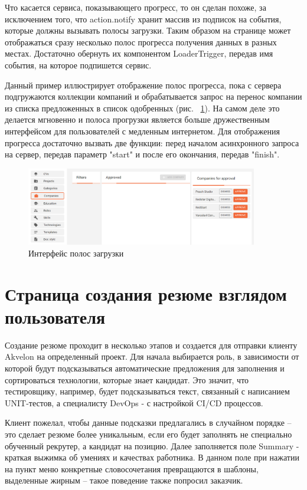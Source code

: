 \documentclass[a4paper,12pt]{diplom}
\begin{document}
Что касается сервиса, показывающего прогресс, то он сделан похоже, за исключением того, что action.notify хранит массив
из подписок на события, которые должны вызывать полосы загрузки. Таким образом на странице может отображаться сразу несколько полос прогресса получения данных в разных местах. Достаточно обернуть их
компонентом LoaderTrigger, передав имя события, на которое подпишется сервис.

Данный пример иллюстрирует отображение полос прогресса, пока с сервера подгружаются коллекции компаний и обрабатывается запрос на перенос компании из списка предложенных в список одобренных (рис. ~\ref{6}).
На самом деле это делается мгновенно и полоса прогрузки является больше дружественным интерфейсом для пользователей с медленным интернетом. Для отображения прогресса достаточно вызвать две функции: перед началом асинхронного запроса на сервер, передав параметр "start" и после его окончания, передав "finish".

\begin{figure}[!ht]
\centering
\includegraphics[width=0.9\textwidth]{resources/progress.png}
\caption{Интерфейс полос загрузки}
\label{6}
\end{figure}

\section{Страница создания резюме взглядом пользователя}
Создание резюме проходит в несколько этапов и создается для отправки клиенту Akvelon на определенный проект.
Для начала выбирается роль, в зависимости от которой будут подсказываться автоматические предложения для заполнения и сортироваться технологии, которые знает кандидат. Это значит, что тестировщику, например, будет подсказываться текст,
связанный с написанием UNIT-тестов, а специалисту DevOps - с настройкой CI/CD процессов.

Клиент пожелал, чтобы данные подсказки предлагались в случайном порядке -- это сделает резюме более уникальным, если его будет заполнять не специально обученный рекрутер, а кандидат на позицию.
Далее заполняется поле Summary - краткая выжимка об умениях и качествах работника. В данном поле при нажатии на пункт меню конкретные словосочетания превращаются в шаблоны, выделенные жирным -- такое поведение также попросил заказчик.
\end{document}
